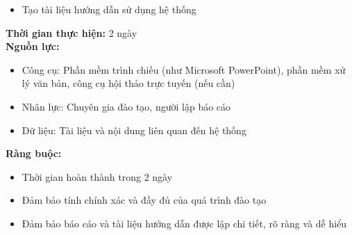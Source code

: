 {\begin{minipage}{\textwidth}
\begin{itemize}
        \item Tạo tài liệu hướng dẫn sử dụng hệ thống
    \end{itemize}
    \noindent \textbf{Thời gian thực hiện:} 2 ngày \\
    \noindent \textbf{Nguồn lực:}
    \begin{itemize}
        \item Công cụ: Phần mềm trình chiếu (như Microsoft PowerPoint), phần mềm xử lý văn bản, công cụ hội thảo trực tuyến (nếu cần)
        \item Nhân lực: Chuyên gia đào tạo, người lập báo cáo
        \item Dữ liệu: Tài liệu và nội dung liên quan đến hệ thống
    \end{itemize}
    \noindent \textbf{Ràng buộc:}
    \begin{itemize}
        \item Thời gian hoàn thành trong 2 ngày
        \item Đảm bảo tính chính xác và đầy đủ của quá trình đào tạo
        \item Đảm bảo báo cáo và tài liệu hướng dẫn được lập chi tiết, rõ ràng và dễ hiểu
    \end{itemize}
    \end{minipage}
}
\newpage
{}    
